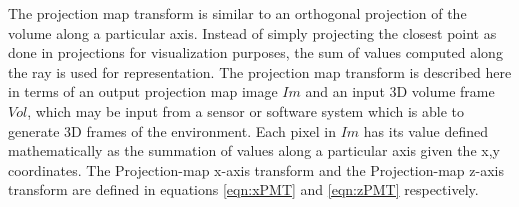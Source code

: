 The projection map transform is similar to an orthogonal projection of the volume along a particular axis. Instead of simply projecting the closest point as done in projections for visualization purposes, the sum of values computed along the ray is used for representation. The projection map transform is described here in terms of an output projection map image $Im$ and an input 3D volume frame $Vol$, which may be input from a sensor or software system which is able to generate 3D frames of the environment. Each pixel in $Im$ has its value defined mathematically as the summation of values along a particular axis given the x,y coordinates. The Projection-map x-axis transform and the Projection-map z-axis transform are defined in equations \ref{eqn:xPMT} and \ref{eqn:zPMT} respectively. \\

